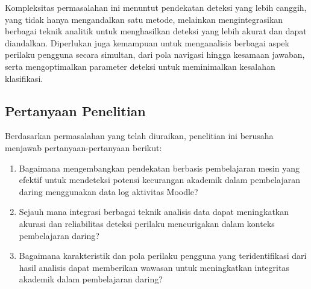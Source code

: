 Kompleksitas permasalahan ini menuntut pendekatan deteksi yang lebih canggih, yang tidak hanya mengandalkan satu metode, melainkan mengintegrasikan berbagai teknik analitik untuk menghasilkan deteksi yang lebih akurat dan dapat diandalkan. Diperlukan juga kemampuan untuk menganalisis berbagai aspek perilaku pengguna secara simultan, dari pola navigasi hingga kesamaan jawaban, serta mengoptimalkan parameter deteksi untuk meminimalkan kesalahan klasifikasi.

\subsection{Pertanyaan Penelitian}
\label{sec:definisiMasalah}
Berdasarkan permasalahan yang telah diuraikan, penelitian ini berusaha menjawab pertanyaan-pertanyaan berikut:
\begin{enumerate}
    \item Bagaimana mengembangkan pendekatan berbasis pembelajaran mesin yang efektif untuk mendeteksi potensi kecurangan akademik dalam pembelajaran daring menggunakan data log aktivitas Moodle?
    \item Sejauh mana integrasi berbagai teknik analisis data dapat meningkatkan akurasi dan reliabilitas deteksi perilaku mencurigakan dalam konteks pembelajaran daring?
    \item Bagaimana karakteristik dan pola perilaku pengguna yang teridentifikasi dari hasil analisis dapat memberikan wawasan untuk meningkatkan integritas akademik dalam pembelajaran daring?
\end{enumerate}

